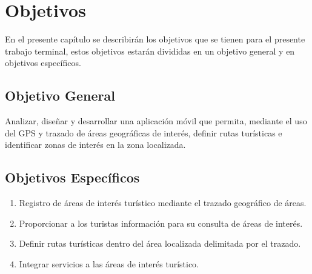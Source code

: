 \chapter{Objetivos}

En el presente capítulo se describirán los objetivos que se tienen para el presente trabajo terminal, estos objetivos estarán divididas en un objetivo general y en objetivos específicos.

\section{Objetivo General}

Analizar, diseñar y desarrollar una aplicación móvil que permita, mediante el uso del GPS y trazado de áreas geográficas de interés, definir rutas turísticas e identificar zonas de interés en la zona localizada.

\section{Objetivos Específicos}

\begin{enumerate}
	\item Registro de áreas de interés turístico mediante el trazado geográfico de áreas.
	
	\item Proporcionar a los turistas información para su consulta de áreas de interés.
	
	\item Definir rutas turísticas dentro del área localizada delimitada por el trazado.
	
	\item Integrar servicios a las áreas de interés turístico.
\end{enumerate}

